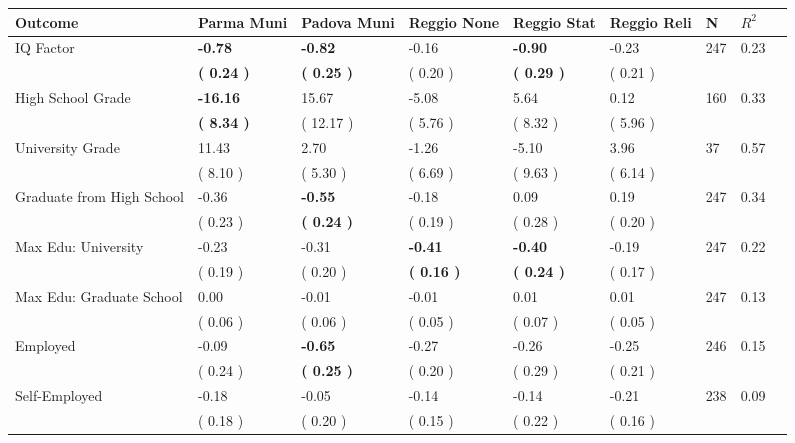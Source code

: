 \begin{tabular}{L{6.2cm} C{1.8cm} C{1.8cm} C{1.8cm} C{1.8cm} C{1.8cm} C{1.8cm} C{0.3cm} C{0.3cm}}
\toprule
 \textbf{Outcome} & \textbf{Parma Muni} & \textbf{Padova Muni} & \textbf{Reggio None} & \textbf{Reggio Stat} & \textbf{Reggio Reli} & \textbf{N} & \textbf{$ R^2$} \\
\midrule
IQ Factor & \textbf{    -0.78} & \textbf{    -0.82} &     -0.16 & \textbf{    -0.90} &     -0.23  & 247 &       0.23 \\ 
 & \textbf{(     0.24 )} & \textbf{(     0.25 )} & (     0.20 ) & \textbf{(     0.29 )} & (     0.21 )  & \\
High School Grade & \textbf{   -16.16} &     15.67 &     -5.08 &      5.64 &      0.12  & 160 &       0.33 \\ 
 & \textbf{(     8.34 )} & (    12.17 ) & (     5.76 ) & (     8.32 ) & (     5.96 )  & \\
University Grade &     11.43 &      2.70 &     -1.26 &     -5.10 &      3.96  & 37 &       0.57 \\ 
 & (     8.10 ) & (     5.30 ) & (     6.69 ) & (     9.63 ) & (     6.14 )  & \\
Graduate from High School &     -0.36 & \textbf{    -0.55} &     -0.18 &      0.09 &      0.19  & 247 &       0.34 \\ 
 & (     0.23 ) & \textbf{(     0.24 )} & (     0.19 ) & (     0.28 ) & (     0.20 )  & \\
Max Edu: University &     -0.23 &     -0.31 & \textbf{    -0.41} & \textbf{    -0.40} &     -0.19  & 247 &       0.22 \\ 
 & (     0.19 ) & (     0.20 ) & \textbf{(     0.16 )} & \textbf{(     0.24 )} & (     0.17 )  & \\
Max Edu: Graduate School &      0.00 &     -0.01 &     -0.01 &      0.01 &      0.01  & 247 &       0.13 \\ 
 & (     0.06 ) & (     0.06 ) & (     0.05 ) & (     0.07 ) & (     0.05 )  & \\
Employed &     -0.09 & \textbf{    -0.65} &     -0.27 &     -0.26 &     -0.25  & 246 &       0.15 \\ 
 & (     0.24 ) & \textbf{(     0.25 )} & (     0.20 ) & (     0.29 ) & (     0.21 )  & \\
Self-Employed &     -0.18 &     -0.05 &     -0.14 &     -0.14 &     -0.21  & 238 &       0.09 \\ 
 & (     0.18 ) & (     0.20 ) & (     0.15 ) & (     0.22 ) & (     0.16 )  & \\

\end{tabular}
